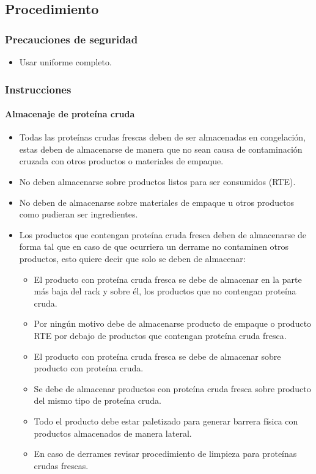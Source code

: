 \subsection{Procedimiento}

\subsubsection{Precauciones de seguridad}

\begin{itemize}
	\item Usar uniforme completo.
\end{itemize}

\subsubsection{Instrucciones}

\paragraph{Almacenaje de proteína cruda}

\begin{itemize}
	\item Todas las proteínas crudas frescas deben de ser almacenadas en congelación, estas deben de almacenarse de manera que no sean causa de contaminación cruzada con otros productos o materiales de empaque.
	\item No deben almacenarse sobre productos listos para ser consumidos (RTE).
	\item No deben de almacenarse sobre materiales de empaque u otros productos como pudieran ser ingredientes.
	\item Los productos que contengan proteína cruda fresca deben de almacenarse de forma tal que en caso de que ocurriera un derrame no contaminen otros productos, esto quiere decir que solo se deben de almacenar:
	\begin{itemize}
		\item El producto con proteína cruda fresca se debe de almacenar en la parte más baja del rack y sobre él, los productos que no contengan proteína cruda.
		\item Por ningún motivo debe de almacenarse producto de empaque o producto RTE por debajo de productos que contengan proteína cruda fresca.
		\item El producto con proteína cruda fresca se debe de almacenar sobre producto con proteína cruda.
		\item Se debe de almacenar productos con proteína cruda fresca sobre producto del mismo tipo de proteína cruda.
		\item Todo el producto debe estar paletizado para generar barrera física con productos almacenados de manera lateral.
		\item En caso de derrames revisar procedimiento de limpieza para proteínas crudas frescas.
	\end{itemize}
\end{itemize}

